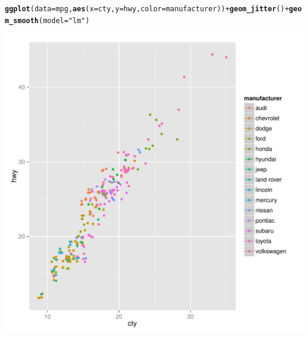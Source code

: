 \documentclass{article}\usepackage[]{graphicx}\usepackage[]{color}
\makeatletter
\def\maxwidth{ %
  \ifdim\Gin@nat@width>\linewidth
    \linewidth
  \else
    \Gin@nat@width
  \fi
}
\newcommand{\hlstr}[1]{\textcolor[rgb]{0.192,0.494,0.8}{#1}}%
\newcommand{\hlopt}[1]{\textcolor[rgb]{0,0,0}{#1}}%
\newcommand{\hlstd}[1]{\textcolor[rgb]{0.345,0.345,0.345}{#1}}%
\newcommand{\hlkwc}[1]{\textcolor[rgb]{0.333,0.667,0.333}{#1}}%
\newcommand{\hlkwd}[1]{\textcolor[rgb]{0.737,0.353,0.396}{\textbf{#1}}}%
\newenvironment{kframe}{%
 \def\at@end@of@kframe{}%
 \ifinner\ifhmode%
  \def\at@end@of@kframe{\end{minipage}}%
  \begin{minipage}{\columnwidth}%
 \fi\fi%
 \def\FrameCommand##1{\hskip\@totalleftmargin \hskip-\fboxsep
 \colorbox{shadecolor}{##1}\hskip-\fboxsep
     \hskip-\linewidth \hskip-\@totalleftmargin \hskip\columnwidth}%
 \MakeFramed {\advance\hsize-\width
   \@totalleftmargin\z@ \linewidth\hsize
   \@setminipage}}%
 {\par\unskip\endMakeFramed%
 \at@end@of@kframe}
\newenvironment{knitrout}{}{} %
\makeatother
\begin{document}
\begin{knitrout}
\color{fgcolor}\begin{kframe}
\begin{alltt}
\hlkwd{ggplot}\hlstd{(}\hlkwc{data} \hlstd{= mpg,} \hlkwd{aes}\hlstd{(}\hlkwc{x} \hlstd{= cty,} \hlkwc{y} \hlstd{= hwy,} \hlkwc{color}\hlstd{=manufacturer))} \hlopt{+} \hlkwd{geom_jitter}\hlstd{()} \hlopt{+} \hlkwd{geom_smooth}\hlstd{(}\hlkwc{model}\hlstd{=}\hlstr{"lm"}\hlstd{)}
\end{alltt}


{\ttfamily\noindent\itshape{}}\end{kframe}
\includegraphics[width=\maxwidth]{figure/explo2-1} 

\end{knitrout}
\end{document}
